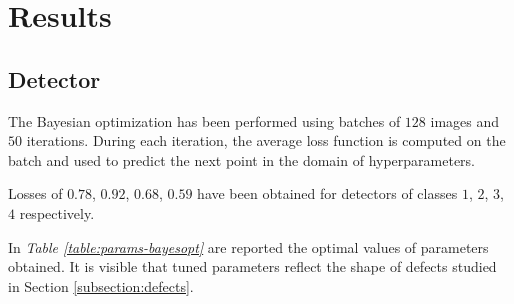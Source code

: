 \section{Results}\label{section:results}
    \subsection{Detector}
    \label{sec:results-detector}
    \par{
    	The Bayesian optimization has been performed using batches of $128$ images and $50$ iterations. During each iteration, the average loss function is computed on the batch and used to predict the next point in the domain of hyperparameters. 
    }	
   	\par{
    	Losses of $0.78$, $0.92$, $0.68$, $0.59$ have been obtained for detectors of classes $1$, $2$, $3$, $4$ respectively.
    }
	\par{
		In \emph{Table \ref{table:params-bayesopt}} are reported the optimal values of parameters obtained. It is visible that tuned parameters reflect the shape of defects studied in Section \ref{subsection:defects}.
	}	
